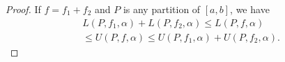\begin{proof}
    If \(f=f_1+f_2\) and \(P\) is any partition of \(\left[a,b\right]\), we have
    \begin{multline}
        L\left(P,f_1,\alpha\right)+L\left(P,f_2,\alpha\right)\leqslant L\left(P,f,\alpha\right)\\
        \leqslant U\left(P,f,\alpha\right)\leqslant U\left(P,f_1,\alpha\right)+U\left(P,f_2,\alpha\right).
    \end{multline}
\end{proof}

